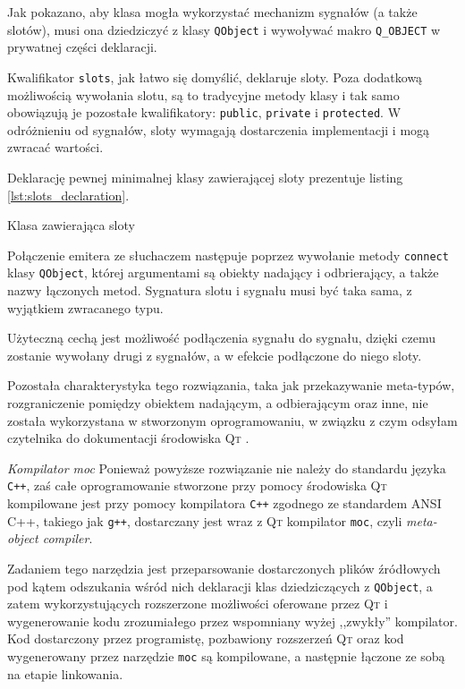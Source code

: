 Jak pokazano, aby klasa mogła wykorzystać mechanizm sygnałów (a także slotów), musi ona dziedziczyć z klasy \verb|QObject| i wywoływać makro \verb|Q_OBJECT| w prywatnej części deklaracji.

Kwalifikator \verb|slots|, jak łatwo się domyślić, deklaruje sloty. Poza dodatkową możliwością wywołania slotu, są to tradycyjne metody klasy i tak samo obowiązują je pozostałe kwalifikatory: \verb|public|, \verb|private| i \verb|protected|. W odróżnieniu od sygnałów, sloty wymagają dostarczenia implementacji i mogą zwracać wartości.

Deklarację pewnej minimalnej klasy zawierającej sloty prezentuje listing \ref{lst:slots_declaration}.

\begin{listing}
  
  \caption{Klasa zawierająca sloty}
  \label{lst:slots_declaration}
\end{listing}

Połączenie emitera ze słuchaczem następuje poprzez wywołanie metody \verb|connect| klasy \verb|QObject|, której argumentami są obiekty nadający i odbrierający, a także nazwy łączonych metod. Sygnatura slotu i sygnału musi być taka sama, z wyjątkiem zwracanego typu.

Użyteczną cechą jest możliwość podłączenia sygnału do sygnału, dzięki czemu zostanie wywołany drugi z sygnałów, a w efekcie podłączone do niego sloty.

Pozostała charakterystyka tego rozwiązania, taka jak przekazywanie meta-typów, rozgraniczenie pomiędzy obiektem nadającym, a odbierającym oraz inne, nie została wykorzystana w stworzonym oprogramowaniu, w związku z czym odsyłam czytelnika do dokumentacji środowiska \textsc{Qt} \citep{Qt}.

\textsl{Kompilator moc} Ponieważ powyższe rozwiązanie nie należy do standardu języka \verb|C++|, zaś całe oprogramowanie stworzone przy pomocy środowiska \textsc{Qt} kompilowane jest przy pomocy kompilatora \verb|C++| zgodnego ze standardem ANSI C++, takiego jak \texttt{g++}, dostarczany jest wraz z \textsc{Qt} kompilator \texttt{moc}, czyli \textsl{meta-object compiler}.

Zadaniem tego narzędzia jest przeparsowanie dostarczonych plików źródłowych pod kątem odszukania wśród nich deklaracji klas dziedziczących z \verb|QObject|, a zatem wykorzystujących rozszerzone możliwości oferowane przez \textsc{Qt} i wygenerowanie kodu zrozumiałego przez wspomniany wyżej ,,zwykły'' kompilator. Kod dostarczony przez programistę, pozbawiony rozszerzeń \textsc{Qt} oraz kod wygenerowany przez narzędzie \texttt{moc} są kompilowane, a następnie łączone ze sobą na etapie linkowania.

